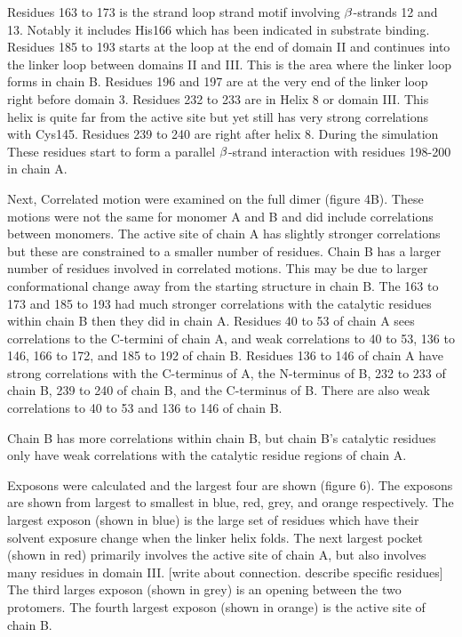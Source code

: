 \documentclass{biophys-new}
\begin{document}
Residues 163 to 173 is the strand loop strand motif involving $\MakeUppercase{\beta}$-strands 12 and 13. Notably it includes His166 which has been indicated in substrate binding. Residues 185 to 193 starts at the loop at the end of domain II and continues into the linker loop between domains II and III. This is the area where the linker loop forms in chain B. Residues 196 and 197 are at the very end of the linker loop right before domain 3. Residues 232 to 233 are in Helix 8 or domain III. This helix is quite far from the active site but yet still has very strong correlations with Cys145. Residues 239 to 240 are right after helix 8. During the simulation These residues start to form a parallel $\MakeUppercase{\beta}$-strand interaction with residues 198-200 in chain A.

Next, Correlated motion were examined on the full dimer (figure 4B). These motions were not the same for monomer A and B and did include correlations between monomers. The active site of chain A has slightly stronger correlations but these are constrained to a smaller number of residues. Chain B has a larger number of residues involved in correlated motions. This may be due to larger conformational change away from the starting structure in chain B. The 163 to 173 and 185 to 193 had much stronger correlations with the catalytic residues within chain B then they did in chain A. Residues 40 to 53 of chain A sees correlations to the C-termini of chain A, and weak correlations to 40 to 53, 136 to 146, 166 to 172, and 185 to 192 of chain B. Residues 136 to 146 of chain A have strong correlations with the C-terminus of A, the N-terminus of B, 232 to 233 of chain B, 239 to 240 of chain B, and the C-terminus of B. There are also weak correlations to 40 to 53 and 136 to 146 of chain B.

Chain B has more correlations within chain B, but chain B's catalytic residues only have weak correlations with the catalytic residue regions of chain A.

Exposons were calculated and the largest four are shown (figure 6). The exposons are shown from largest to smallest in blue, red, grey, and orange respectively. The largest exposon (shown in blue) is the large set of residues which have their solvent exposure change when the linker helix folds. The next largest pocket (shown in red) primarily involves the active site of chain A, but also involves many residues in domain III. [write about connection. describe specific residues] The third larges exposon (shown in grey) is an opening between the two protomers. The fourth largest exposon (shown in orange) is the active site of chain B. 
\end{document}
